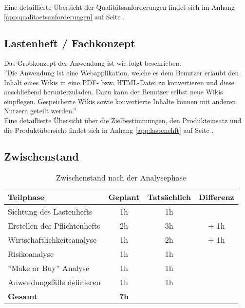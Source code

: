 \documentclass[12pt, xcolor=dvipsnames]{scrartcl}
\begin{document}
Eine detaillierte Übersicht der Qualitätsanforderungen findet sich im Anhang \ref{app:qualitaetsanforderungen} auf Seite \pageref{app:qualitaetsanforderungen}.


\subsection{Lastenheft / Fachkonzept}

Das Grobkonzept der Anwendung ist wie folgt beschrieben: \\

''Die Anwendung ist eine Webapplikation, welche es dem Benutzer erlaubt den Inhalt eines 
Wikis in eine PDF- bzw. HTML-Datei zu konvertieren und diese anschließend herunterzuladen.
Dazu kann der Benutzer selbst neue Wikis einpflegen. Gespeicherte Wikis sowie konvertierte Inhalte können mit anderen Nutzern geteilt werden.'' \\

Eine detaillierte Übersicht über die Zielbestimmungen, den Produkteinsatz und die Produktübersicht findet sich in Anhang \ref{app:lastenehft} auf Seite \pageref{app:lastenehft}.


\subsection{Zwischenstand}


\begin{table}[H]
	\centering
	\begin{tabular}{lccc}

		\rowcolor{white!15}				
		\textbf{Teilphase} & \textbf{Geplant} & \textbf{Tatsächlich} & \textbf{Differenz} \\\hline		
		

		Sichtung des Lastenhefts & 1h & 1h & \\	    
	    Erstellen des Pflichtenhefts & 2h & 3h &  + 1h\\	    
	    Wirtschaftlichkeitsanalyse & 1h & 2h & + 1h\\	     
	    Risikoanalyse & 1h & 1h & \\	      
	    ''Make or Buy'' Analyse & 1h & 1h & \\	    
		Anwendungsfälle definieren & 1h & 1h & \\\hline

		\rowcolor{white!15}				
		\textbf{Gesamt} & \textbf{7h} & \textbf{\timeAnalyse} & \textbf{\timeAnalyseDiff} \\			

	    
	\end{tabular}
	\caption{Zwischenstand nach der Analysephase}
	\label{tab:zwischenstand_analysephase}
	\end{table}
\end{document}
